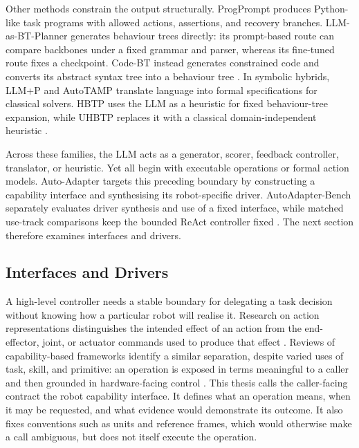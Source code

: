 Other methods constrain the output structurally. ProgPrompt produces
Python-like task programs with allowed actions, assertions, and recovery
branches. LLM-as-BT-Planner generates behaviour trees directly: its
prompt-based route can compare backbones under a fixed grammar and parser,
whereas its fine-tuned route fixes a checkpoint. Code-BT instead generates
constrained code and converts its abstract syntax tree into a behaviour tree
\citep{singh2023progprompt,ao2025llmbtplanner,zhang2025codebt}.
In symbolic hybrids, LLM+P and AutoTAMP translate language into formal
specifications for classical solvers. HBTP uses the LLM as a heuristic for
fixed behaviour-tree expansion, while UHBTP replaces it with a classical
domain-independent heuristic
\citep{liu2023llmplusp,chen2024autotamp,cai2025hbtp,chen2025btpg}.

Across these families, the LLM acts as a generator, scorer, feedback
controller, translator, or heuristic. Yet all begin with executable operations
or formal action models. Auto-Adapter targets this preceding boundary by
constructing a capability interface and synthesising its robot-specific
driver. AutoAdapter-Bench separately evaluates driver synthesis and use of a
fixed interface, while matched use-track comparisons keep the bounded ReAct
controller fixed \citep{yao2023react}. The next section therefore examines
interfaces and drivers.

\subsection{Interfaces and Drivers}
\label{sec:interfaces-drivers}

A high-level controller needs a stable boundary for delegating a task decision
without knowing how a particular robot will realise it. Research on action
representations distinguishes the intended effect of an action from the
end-effector, joint, or actuator commands used to produce that effect
\citep{zech2019action}. Reviews of capability-based frameworks identify a
similar separation, despite varied uses of task, skill, and primitive: an
operation is exposed in terms meaningful to a caller and then grounded in
hardware-facing control \citep{pantano2022capabilitysurvey}. This thesis calls
the caller-facing contract the robot capability interface. It defines what an
operation means, when it may be requested, and what evidence would demonstrate
its outcome. It also fixes conventions such as units and reference frames,
which would otherwise make a call ambiguous, but does not itself execute the
operation.

